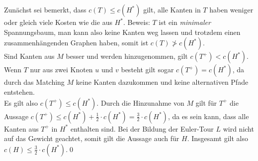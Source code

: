 \documentclass[a4paper]{article}
\begin{document}
	\maketitle
	\section{}
		Zunächst sei bemerkt, dass $c(T)\leq c(H^*)$ gilt, alle Kanten in $T$ haben weniger oder gleich viele Kosten wie die aus $H^*$.\n
		Beweis: $T$ ist ein \textit{minimaler} Spannungsbaum, man kann also keine Kanten weg lassen und trotzdem einen zusammenhängenden Graphen haben, somit ist $c(T)\not> c(H^*)$.\\
		Sind Kanten aus $M$ besser und werden hinzugenommen, gilt $c(T^+)<c(H^*)$.
		Wenn $T$ nur aus zwei Knoten $u$ und $v$ besteht gilt sogar $c(T^+)=c(H^*)$, da durch das Matching $M$ keine Kanten dazukommen und keine alternativen Pfade entstehen.\\
		Es gilt also $c(T^+)\leq c(H^*)$.\n
		Durch die Hinzunahme von $M$ gilt für $T^+$ die Aussage $c(T^+)\leq c(H^*)+\frac{1}{2}\cdot c(H^*)=\frac{3}{2}\cdot c(H^*)$, da es sein kann, dass alle Kanten aus $T^+$ in $H^*$ enthalten sind.
		Bei der Bildung der Euler-Tour $L$ wird nicht auf das Gewicht geachtet, somit gilt die Aussage auch für $H$.\n
		Insgesamt gilt also $c(H)\leq \frac{3}{2}\cdot c(H^*)$.\qed
	\section{}
\end{document}
